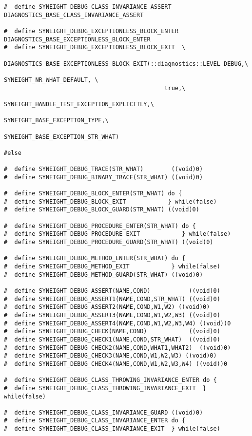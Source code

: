 \begin{verbatim}
#  define SYNEIGHT_DEBUG_CLASS_INVARIANCE_ASSERT  DIAGNOSTICS_BASE_CLASS_INVARIANCE_ASSERT

#  define SYNEIGHT_DEBUG_EXCEPTIONLESS_BLOCK_ENTER  DIAGNOSTICS_BASE_EXCEPTIONLESS_BLOCK_ENTER
#  define SYNEIGHT_DEBUG_EXCEPTIONLESS_BLOCK_EXIT  \
    DIAGNOSTICS_BASE_EXCEPTIONLESS_BLOCK_EXIT(::diagnostics::LEVEL_DEBUG,\
                                              SYNEIGHT_NR_WHAT_DEFAULT, \
                                              true,\
                                              SYNEIGHT_HANDLE_TEST_EXCEPTION_EXPLICITLY,\
                                              SYNEIGHT_BASE_EXCEPTION_TYPE,\
                                              SYNEIGHT_BASE_EXCEPTION_STR_WHAT)

#else

#  define SYNEIGHT_DEBUG_TRACE(STR_WHAT)        ((void)0)
#  define SYNEIGHT_DEBUG_BINARY_TRACE(STR_WHAT) ((void)0)

#  define SYNEIGHT_DEBUG_BLOCK_ENTER(STR_WHAT) do {
#  define SYNEIGHT_DEBUG_BLOCK_EXIT            } while(false)
#  define SYNEIGHT_DEBUG_BLOCK_GUARD(STR_WHAT) ((void)0)

#  define SYNEIGHT_DEBUG_PROCEDURE_ENTER(STR_WHAT) do {
#  define SYNEIGHT_DEBUG_PROCEDURE_EXIT            } while(false)
#  define SYNEIGHT_DEBUG_PROCEDURE_GUARD(STR_WHAT) ((void)0)

#  define SYNEIGHT_DEBUG_METHOD_ENTER(STR_WHAT) do {
#  define SYNEIGHT_DEBUG_METHOD_EXIT            } while(false)
#  define SYNEIGHT_DEBUG_METHOD_GUARD(STR_WHAT) ((void)0)

#  define SYNEIGHT_DEBUG_ASSERT(NAME,COND)           ((void)0)
#  define SYNEIGHT_DEBUG_ASSERT1(NAME,COND,STR_WHAT) ((void)0)
#  define SYNEIGHT_DEBUG_ASSERT2(NAME,COND,W1,W2) ((void)0)
#  define SYNEIGHT_DEBUG_ASSERT3(NAME,COND,W1,W2,W3) ((void)0)
#  define SYNEIGHT_DEBUG_ASSERT4(NAME,COND,W1,W2,W3,W4) ((void))0
#  define SYNEIGHT_DEBUG_CHECK(NAME,COND)            ((void)0)
#  define SYNEIGHT_DEBUG_CHECK1(NAME,COND,STR_WHAT)  ((void)0)
#  define SYNEIGHT_DEBUG_CHECK2(NAME,COND,WHAT1,WHAT2)  ((void)0)
#  define SYNEIGHT_DEBUG_CHECK3(NAME,COND,W1,W2,W3) ((void)0)
#  define SYNEIGHT_DEBUG_CHECK4(NAME,COND,W1,W2,W3,W4) ((void))0

#  define SYNEIGHT_DEBUG_CLASS_THROWING_INVARIANCE_ENTER do {
#  define SYNEIGHT_DEBUG_CLASS_THROWING_INVARIANCE_EXIT  } while(false)

#  define SYNEIGHT_DEBUG_CLASS_INVARIANCE_GUARD ((void)0)
#  define SYNEIGHT_DEBUG_CLASS_INVARIANCE_ENTER do {
#  define SYNEIGHT_DEBUG_CLASS_INVARIANCE_EXIT  } while(false)


\end{verbatim}

